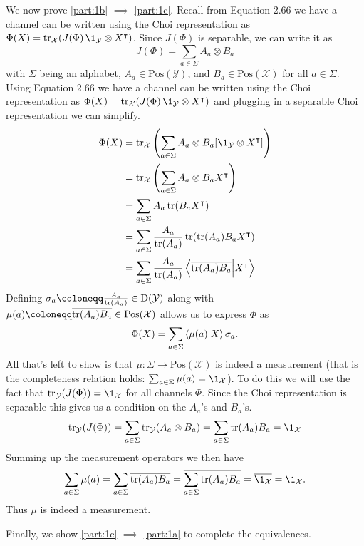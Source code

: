 \documentclass[boxes,pages,color=SeaGreen]{homework}
\newcommand{\X}{\mathcal{X}}
\newcommand{\Y}{\mathcal{Y}}
\newcommand{\Pos}{\mathrm{Pos}}
\newcommand{\Density}{\mathrm{D}}
\begin{document}
\begin{solution}
  We now prove \ref{part:1b} $\implies$ \ref{part:1c}.
  Recall from Equation 2.66 we have a channel can be written using the Choi representation as $\Phi(X) = \tr_\X(J(\Phi)\,\1_\Y\otimes X^\intercal)$.
  Since $J(\Phi)$ is separable, we can write it as
  \begin{equation*}
    J(\Phi) = \sum_{a\in\Sigma}A_a\otimes B_a
  \end{equation*}
  with $\Sigma$ being an alphabet, $A_a\in\Pos(\Y)$, and $B_a\in\Pos(\X)$ for all $a\in\Sigma$.
  Using Equation 2.66 we have a channel can be written using the Choi representation as $\Phi(X) = \tr_\X(J(\Phi)\,\1_\Y\otimes X^\intercal)$ and plugging in a separable Choi representation we can simplify.
  \begin{align*}
    \Phi(X) & = \tr_\X\qty(\sum_{a\in\Sigma}A_a\otimes B_a [\1_\Y\otimes X^\intercal])        \\
            & = \tr_\X\qty(\sum_{a\in\Sigma}A_a \otimes B_a X^\intercal)                      \\
            & = \sum_{a\in\Sigma}A_a\tr(B_a X^\intercal)                                      \\
            & = \sum_{a\in\Sigma}\frac{A_a}{\tr(A_a)}\tr(\tr(A_a)B_a X^\intercal)             \\
            & = \sum_{a\in\Sigma}\frac{A_a}{\tr(A_a)}\ip{\overline{\tr(A_a)B_a}}{X^\intercal}
  \end{align*}
  Defining $\sigma_a \defeq \frac{A_a}{\tr(A_a)}\in\Density(\Y)$ along with $\mu(a) \defeq \overline{\tr(A_a)B_a} \in \Pos(\X)$ allows us to express $\Phi$ as
  \begin{equation*}
    \Phi(X) = \sum_{a\in\Sigma}\ip{\mu(a)}{X}\sigma_a.
  \end{equation*}
  All that's left to show is that $\mu:\Sigma\to\Pos(\X)$ is indeed a measurement (that is the completeness relation holds: $\sum_{a\in\Sigma}\mu(a) = \1_\X$).
  To do this we will use the fact that $\tr_\Y(J(\Phi)) = \1_\X$ for all channels $\Phi$.
  Since the Choi representation is separable this gives us a condition on the $A_a$'s and $B_a$'s.
  \begin{equation*}
    \tr_\Y(J(\Phi)) = \sum_{a\in\Sigma}\tr_\Y(A_a\otimes B_a) = \sum_{a\in\Sigma}\tr(A_a)B_a = \1_\X
  \end{equation*}
  Summing up the measurement operators we then have
  \begin{align*}
    \sum_{a\in\Sigma}\mu(a) = \sum_{a\in\Sigma}\overline{\tr(A_a)B_a} = \overline{\sum_{a\in\Sigma}\tr(A_a)B_a} = \overline{\1_\X} = \1_\X.
  \end{align*}
  Thus $\mu$ is indeed a measurement.


  Finally, we show \ref{part:1c} $\implies$ \ref{part:1a} to complete the equivalences.
\end{solution}
\end{document}
